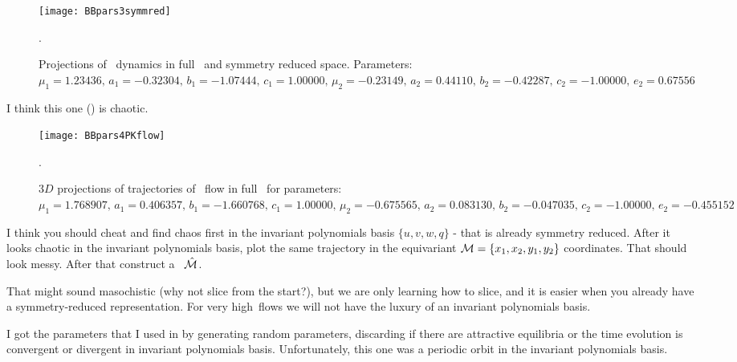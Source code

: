\begin{description}
\begin{figure}%
  \begin{center}
  \texttt{[image: BBpars3symmred]}
  \end{center}
  \caption{Projections of \twoMode\ dynamics in full \statesp\ and symmetry reduced space. Parameters: $\mu_1 = 1.23436,\,a_1=-0.32304,\,b_1=-1.07444,\,c_1=1.00000,\,\mu_2=-0.23149,\,a_2=0.44110,\,b_2=-0.42287,\,c_2=-1.00000,\,e_2=0.67556$}.
  \label{fig:BBpars3symmred}
\end{figure}

\item[2013-08-08  Burak] I think this one () is chaotic.

\begin{figure}%
  \begin{center}
  \texttt{[image: BBpars4PKflow]}
  \end{center}
  \caption{$3D$ projections of trajectories of \twoMode\ flow in full \statesp\ for parameters: $\mu_1 = 1.768907,\,a_1=0.406357,\,b_1=-1.660768,\,c_1=1.00000,\,\mu_2=-0.675565,\,a_2=0.083130,\,b_2=-0.047035,\,c_2=-1.00000,\,e_2=-0.455152$}.
  \label{fig:BBpars4PKflow}
\end{figure}

\item[2013-08-10  Predrag] I think you should cheat and find chaos
    first in the invariant polynomials basis $\{u,v,w,q\}$ -
    that is already symmetry reduced. After it looks chaotic in the
    invariant polynomials basis, plot the same trajectory in the equivariant
 ${\cal M} = \{x_1,x_2,y_1,y_2\}$ coordinates. That should look messy. After
that construct a \slice\ $\hat{\cal M}$.

That might sound masochistic (why not slice from the start?), but we
are only learning how to slice, and it is easier when you already have a
symmetry-reduced representation. For very high\dmn\ flows we will
not have the luxury of an invariant polynomials basis.

\item[2013-08-12  Burak] I got the parameters that I used in  by generating random parameters, discarding if there are attractive equilibria or the time evolution is convergent or divergent in invariant polynomials basis. Unfortunately, this one was a periodic orbit in the invariant polynomials basis.


\end{description}
